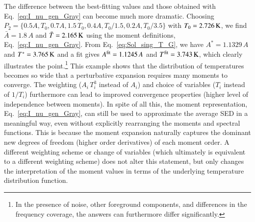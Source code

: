 \documentclass[usenatbib]{mn2e}
\begin{document}
The difference between the best-fitting values and those obtained with Eq.~\eqref{eq:I_nu_gen_Gray} can become much more dramatic. Choosing $P_2=\{0.5 A, T_0, 0.7 A, 1.5\,T_0, 0.4 A, T_0/1.5, 0.2 A, T_0/3.5\}$ with $T_0=2.726\,{\rm K}$, we find $\bar{A}=1.8\,A$ and $\bar{T}=2.165\,{\rm K}$ using the moment definitions, Eq.~\eqref{eq:I_nu_gen_Gray}. 
%
From Eq.~\eqref{eq:Sol_sing_T_G}, we have $A^*=1.1329\,A$ and $T^*=3.765\,{\rm K}$ and a fit gives $A^{\rm fit}=1.1245\,A$ and $T^{\rm fit}=3.743\,{\rm K}$, which clearly illustrates the point.\footnote{In the presence of noise, other foreground components, and differences in the frequency coverage, the answers can furthermore differ significantly.} 
%
This example shows that the distribution of temperatures becomes so wide that a perturbative expansion requires many moments to converge. The weighting ($A_i\,T_i^3$ instead of $A_i$) and choice of variables ($T_i$ instead of $1/T_i$) furthermore can lead to improved convergence properties (higher level of independence between moments). In spite of all this, the moment representation, Eq.~\eqref{eq:I_nu_gen_Gray}, can still be used to approximate the average SED in a meaningful way, even without explicitly rearranging the moments and spectral functions. This is because the moment expansion naturally captures the dominant new degrees of freedom (higher order derivatives) of each moment order. A different weighting scheme or change of variables (which ultimately is equivalent to a different weighting scheme) does not alter this statement, but only changes the interpretation of the moment values in terms of the underlying temperature distribution function.
\end{document}
